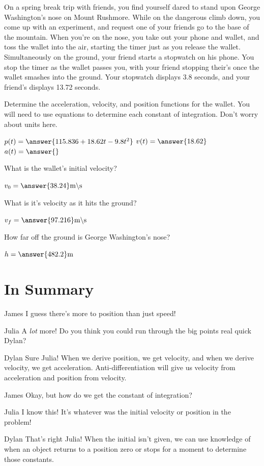 \documentclass{ximera}
\begin{document}
\begin{question}
On a spring break trip with friends, you find yourself dared to stand upon George Washington's nose on Mount Rushmore. While on the dangerous climb down, you come up with an experiment, and request one of your friends go to the base of the mountain. When you're on the nose, you take out your phone and wallet, and toss the wallet into the air, starting the timer just as you release the wallet. Simultaneously on the ground, your friend starts a stopwatch on his phone. You stop the timer as the wallet passes you, with your friend stopping their's once the wallet smashes into the ground. Your stopwatch displays 3.8 seconds, and your friend's displays 13.72 seconds.

Determine the acceleration, velocity, and position functions for the wallet. You will need to use equations to determine each constant of integration. Don't worry about units here.

$p(t) = \answer{115.836+18.62t-9.8t^2}$
$v(t) = \answer{18.62}$
$a(t) = \answer{}$

What is the wallet's initial velocity?

$v_0 = \answer{38.24} \text{m} \backslash \text{s}$

What is it's velocity as it hits the ground?

$v_f = \answer{97.216} \text{m} \backslash \text{s}$

How far off the ground is George Washington's nose?

$h = \answer{482.2} \text{m}$
\end{question}

\section{In Summary}
\begin{dialogue}
\item[James] I guess there's more to position than just speed!
\item[Julia] A \textit{lot} more! Do you think you could run through the big points real quick Dylan?
\item[Dylan] Sure Julia! When we derive position, we get velocity, and when we derive velocity, we get acceleration. Anti-differentiation will give us velocity from acceleration and position from velocity.
\item[James] Okay, but how do we get the constant of integration?
\item[Julia] I know this! It's whatever was the initial velocity or position in the problem!
\item[Dylan] That's right Julia! When the initial isn't given, we can use knowledge of when an object returns to a position zero or stops for a moment to determine those constants.
\end{dialogue}
\end{document}
